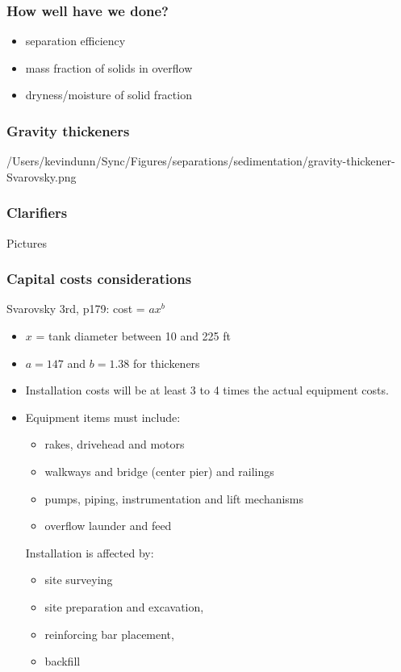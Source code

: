 \begin{frame}\frametitle{How well have we done?}
	\begin{itemize}
		\item	separation efficiency
		\item	mass fraction of solids in overflow
		\item	dryness/moisture of solid fraction
	\end{itemize}
\end{frame}

\begin{frame}\frametitle{Gravity thickeners}
	/Users/kevindunn/Sync/Figures/separations/sedimentation/gravity-thickener-Svarovsky.png
\end{frame}

\begin{frame}\frametitle{Clarifiers}
	Pictures
\end{frame}

\begin{frame}\frametitle{Capital costs considerations}
	Svarovsky 3rd, p179: cost = $a x^b$
	\begin{itemize}
		\item	$x$ = tank diameter between 10 and 225 ft
		\item	$a=147$ and $b=1.38$ for thickeners
	\end{itemize}
	
	\begin{itemize}
		\item	Installation costs will be at least 3 to 4 times the actual equipment costs.
		\item	Equipment items must include:
		\begin{itemize}
			\item	rakes, drivehead and motors
			\item	walkways and bridge (center pier) and railings
			\item	pumps, piping, instrumentation and lift mechanisms
			\item	overflow launder and feed 
		\end{itemize}
		Installation is affected by:
		\begin{itemize}			
			\item	site surveying
			\item	site preparation and excavation, 
			\item	reinforcing bar placement, 
			\item	backfill			
		\end{itemize}		
	\end{itemize}	
\end{frame}

